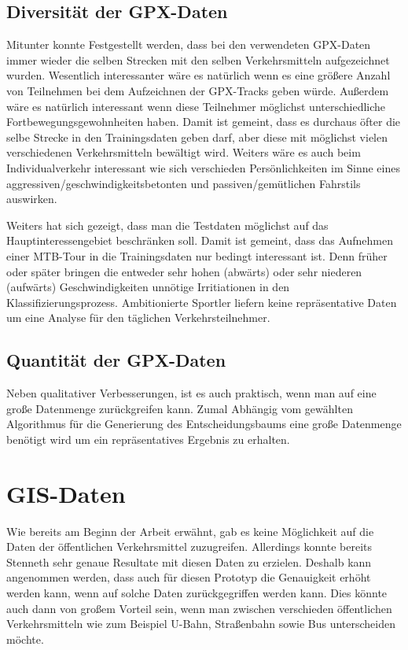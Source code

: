 \subsection{Diversität der GPX-Daten}
Mitunter konnte Festgestellt werden, dass bei den verwendeten GPX-Daten immer wieder die selben Strecken mit den selben Verkehrsmitteln aufgezeichnet wurden. Wesentlich interessanter wäre es natürlich wenn es eine größere Anzahl von Teilnehmen bei dem Aufzeichnen der GPX-Tracks geben würde. Außerdem wäre es natürlich interessant wenn diese Teilnehmer möglichst unterschiedliche Fortbewegungsgewohnheiten haben. Damit ist gemeint, dass es durchaus öfter die selbe Strecke in den Trainingsdaten geben darf, aber diese mit möglichst vielen verschiedenen Verkehrsmitteln bewältigt wird. Weiters wäre es auch beim Individualverkehr interessant wie sich verschieden Persönlichkeiten im Sinne eines aggressiven/geschwindigkeitsbetonten und passiven/gemütlichen Fahrstils auswirken. 

Weiters hat sich gezeigt, dass man die Testdaten möglichst auf das Hauptinteressengebiet beschränken soll. Damit ist gemeint, dass das Aufnehmen einer MTB-Tour in die Trainingsdaten nur bedingt interessant ist. Denn früher oder später bringen die entweder sehr hohen (abwärts) oder sehr niederen (aufwärts) Geschwindigkeiten unnötige Irritiationen in den Klassifizierungsprozess. Ambitionierte Sportler liefern keine repräsentative Daten um eine Analyse für den täglichen Verkehrsteilnehmer. 

\subsection{Quantität der GPX-Daten}
Neben qualitativer Verbesserungen, ist es auch praktisch, wenn man auf eine große Datenmenge zurückgreifen kann. Zumal Abhängig vom gewählten Algorithmus für die Generierung des Entscheidungsbaums eine große Datenmenge benötigt wird um ein repräsentatives Ergebnis zu erhalten.

\section{GIS-Daten}
Wie bereits am Beginn der Arbeit erwähnt, gab es keine Möglichkeit auf die Daten der öffentlichen Verkehrsmittel zuzugreifen. Allerdings konnte bereits Stenneth \cite{stenneth_transportation_2011} sehr genaue Resultate mit diesen Daten zu erzielen. Deshalb kann angenommen werden, dass auch für diesen Prototyp die Genauigkeit erhöht werden kann, wenn auf solche Daten zurückgegriffen werden kann. Dies könnte auch dann von großem Vorteil sein, wenn man zwischen verschieden öffentlichen Verkehrsmitteln wie zum Beispiel U-Bahn, Straßenbahn sowie Bus unterscheiden möchte. 


